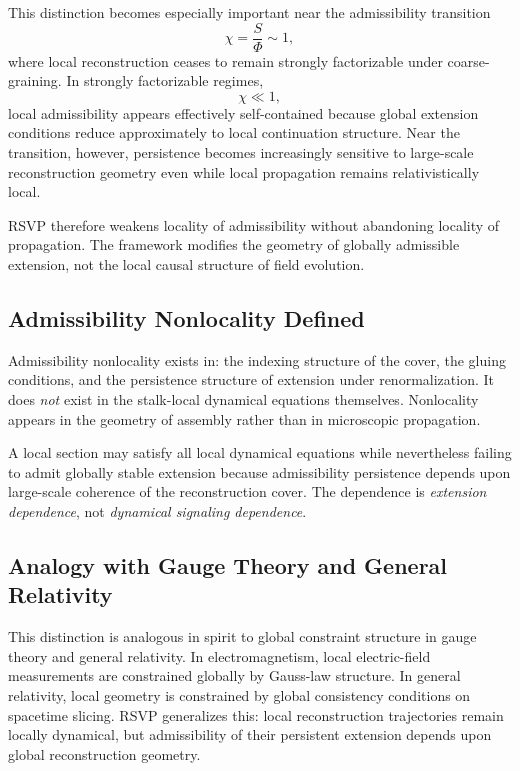 \documentclass[11pt, a4paper]{article}
\theoremstyle{plain}
\theoremstyle{definition}
\theoremstyle{remark}
\begin{document}
This distinction becomes especially important near the admissibility transition
\[
  \chi = \frac{S}{\Phi} \sim 1,
\]
where local reconstruction ceases to remain strongly factorizable under
coarse-graining.  In strongly factorizable regimes,
\[
  \chi \ll 1,
\]
local admissibility appears effectively self-contained because global extension
conditions reduce approximately to local continuation structure.  Near the
transition, however, persistence becomes increasingly sensitive to large-scale
reconstruction geometry even while local propagation remains relativistically local.

RSVP therefore weakens locality of admissibility without abandoning locality of
propagation.  The framework modifies the geometry of globally admissible extension,
not the local causal structure of field evolution.

\subsection{Admissibility Nonlocality Defined}

Admissibility nonlocality exists in: the indexing structure of the cover, the gluing
conditions, and the persistence structure of extension under renormalization. It does
\emph{not} exist in the stalk-local dynamical equations themselves. Nonlocality
appears in the geometry of assembly rather than in microscopic propagation.

A local section may satisfy all local dynamical equations while nevertheless failing
to admit globally stable extension because admissibility persistence depends upon
large-scale coherence of the reconstruction cover. The dependence is
\emph{extension dependence}, not \emph{dynamical signaling dependence}.

\subsection{Analogy with Gauge Theory and General Relativity}

This distinction is analogous in spirit to global constraint structure in gauge
theory and general relativity. In electromagnetism, local electric-field measurements
are constrained globally by Gauss-law structure. In general relativity, local
geometry is constrained by global consistency conditions on spacetime slicing. RSVP
generalizes this: local reconstruction trajectories remain locally dynamical, but
admissibility of their persistent extension depends upon global reconstruction
geometry.
\end{document}
